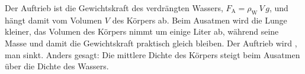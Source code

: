 Der Auftrieb ist die Gewichtskraft des verdrängten Wassers, $F_\text{A} = \rho_\text{W}\,V\,g$, und hängt damit vom Volumen $V$ des Körpers ab. Beim Ausatmen wird die Lunge kleiner, das Volumen des Körpers nimmt um einige Liter ab, während seine Masse und damit die Gewichtskraft praktisch gleich bleiben. Der Auftrieb wird , man sinkt. Anders gesagt: Die mittlere Dichte des Körpers steigt beim Ausatmen über die Dichte des Wassers.
